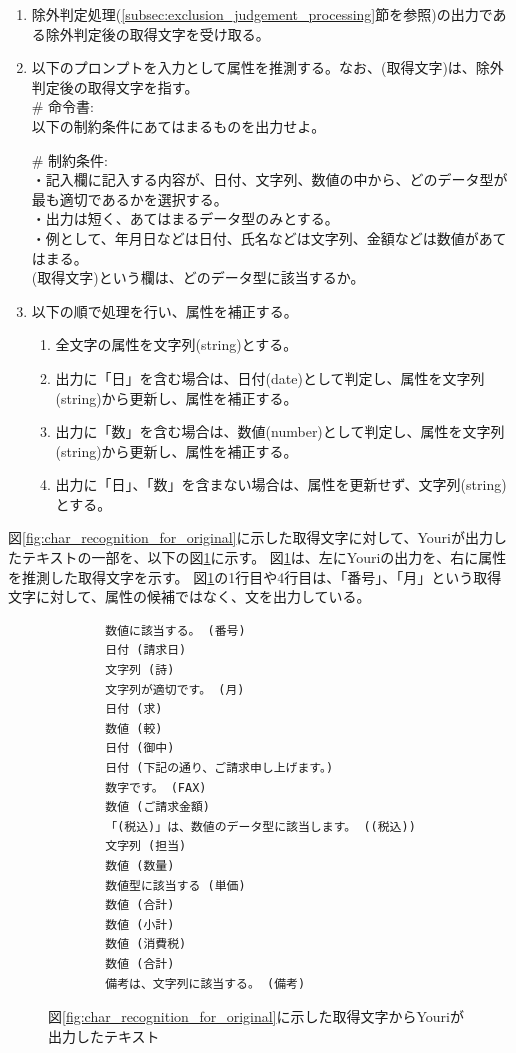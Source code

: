 \begin{enumerate}
    \item 除外判定処理(\ref{subsec:exclusion_judgement_processing}節を参照)の出力である除外判定後の取得文字を受け取る。
    \item 以下のプロンプトを入力として属性を推測する。なお、(取得文字)は、除外判定後の取得文字を指す。\\
        \# 命令書:\\
        以下の制約条件にあてはまるものを出力せよ。
        
        \# 制約条件:\\
        ・記入欄に記入する内容が、日付、文字列、数値の中から、どのデータ型が最も適切であるかを選択する。\\
        ・出力は短く、あてはまるデータ型のみとする。\\
        ・例として、年月日などは日付、氏名などは文字列、金額などは数値があてはまる。\\
        
        (取得文字)という欄は、どのデータ型に該当するか。

    \item 以下の順で処理を行い、属性を補正する。
        \begin{enumerate}
            \item 全文字の属性を文字列(string)とする。
            \item 出力に「日」を含む場合は、日付(date)として判定し、属性を文字列(string)から更新し、属性を補正する。
            \item 出力に「数」を含む場合は、数値(number)として判定し、属性を文字列(string)から更新し、属性を補正する。
            \item 出力に「日」、「数」を含まない場合は、属性を更新せず、文字列(string)とする。
        \end{enumerate}
\end{enumerate}

図\ref{fig:char_recognition_for_original}に示した取得文字に対して、Youriが出力したテキストの一部を、以下の図\ref{fig:output_Youri}に示す。
図\ref{fig:output_Youri}は、左にYouriの出力を、右に属性を推測した取得文字を示す。
図\ref{fig:output_Youri}の1行目や4行目は、「番号」、「月」という取得文字に対して、属性の候補ではなく、文を出力している。

\lstset{language=}
\begin{figure}[t]
    \begin{lstlisting}
        数値に該当する。 (番号)
        日付 (請求日)
        文字列 (詩)
        文字列が適切です。 (月)
        日付 (求)
        数値 (較)
        日付 (御中)
        日付 (下記の通り、ご請求申し上げます。)
        数字です。 (FAX)
        数値 (ご請求金額)
        「(税込)」は、数値のデータ型に該当します。 ((税込))
        文字列 (担当)
        数値 (数量)
        数値型に該当する (単価)
        数値 (合計)
        数値 (小計)
        数値 (消費税)
        数値 (合計)
        備考は、文字列に該当する。 (備考)
    \end{lstlisting}
    \caption{図\ref{fig:char_recognition_for_original}に示した取得文字からYouriが出力したテキスト}
    \label{fig:output_Youri}
\end{figure}

